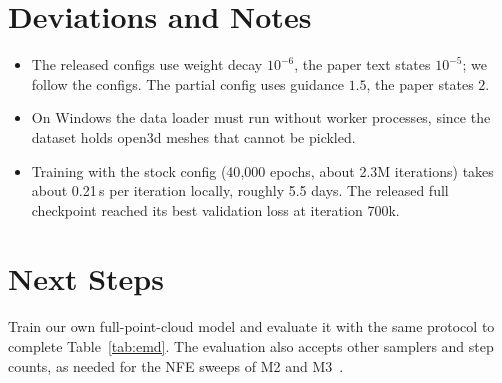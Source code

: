 \documentclass[conference]{IEEEtran}
\begin{document}
\section{Deviations and Notes}

\begin{itemize}
  \item The released configs use weight decay $10^{-6}$, the paper text states $10^{-5}$; we follow the
  configs. The partial config uses guidance $1.5$, the paper states $2$.
  \item On Windows the data loader must run without worker processes, since the dataset holds open3d
  meshes that cannot be pickled.
  \item Training with the stock config (40{,}000 epochs, about 2.3M iterations) takes about 0.21\,s per
  iteration locally, roughly 5.5 days. The released full checkpoint reached its best validation loss at
  iteration 700k.\end{itemize}

\section{Next Steps}

Train our own full-point-cloud model and evaluate it with the same protocol to complete
Table~\ref{tab:emd}. The evaluation also accepts other samplers and step counts, as needed for the NFE
sweeps of M2 and M3~\cite{kwon2026graspmeanflow}.



\end{document}
